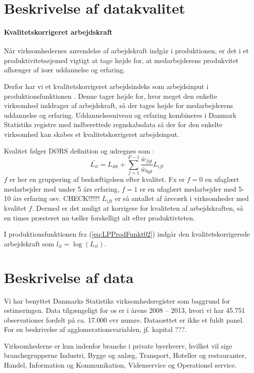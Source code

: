 \section{Beskrivelse af datakvalitet}
\paragraph{Kvalitetskorrigeret arbejdskraft}
Når virksomhedernes anvendelse af arbejdskraft indgår i produktionen, er det i et produktivitetsøjemed vigtigt at tage højde for, at medarbejderens produkvitet afhænger af især uddannelse og erfaring.

Derfor har vi et kvalitetskorrigeret arbejdsindeks som arbejdsinput i produktionsfunktionen \cite[s. 5]{dors2010baggrund}. Denne tager højde for, hvor meget den enkelte virksomhed inddrager af arbejdskraft, så der tages højde for medarbejderens uddannelse og erfaring. Uddannelsesniveau og erfaring kombineres i Danmark Statistiks registre med indberettede regnskabsdata så der for den enkelte virksomhed kan skabes et kvalitetskorrigeret arbejdsinput.

Kvalitet følger DØRS definition og udregnes som \cite[s. 5]{dors2010baggrund}:
\begin{equation}
	\bar{L_{it}} = 
	L_{i0t} + \sum_{f=1}^{F-1} \frac{\bar{w}_{fgt}}{\bar{w}_{0gt}} 
	L_{ift}
\end{equation}
$f$ er her en gruppering af beskæftigelsen efter kvalitet. Fx er $f=0$ en ufaglært medarbejder med under 5 års erfaring, $f=1$ er en ufaglært medarbejder med 5-10 års erfaring osv. CHECK!!!!!!
$L_{ift}$ er så antallet af årsværk i virksomheder med kvalitet $f$. Dermed er det muligt at korrigere for kvaliteten af arbejdskraften, så en times præsteret nu tæller forskelligt alt efter produktivteten.

I produktionsfunktionen fra (\ref{eq:LPProdFunkt02}) indgår den kvalitetskorrigerede arbejdskraft som $l_{it} = \log(L_{it})$.  

\section{Beskrivelse af data}
Vi har benyttet Danmarks Statistiks virksomhedsregister som baggrund for estimeringen. Data tilgængeligt for os er i årene 2008 -- 2013, hvori vi har 45.751 observationer fordelt på ca. 17.000 cvr numre. Datasættet er ikke et fuldt panel. For en beskrivelse af agglomerationsvariablen, jf. kapital ???.

Virksomhederne er kun indenfor branche i private byerhverv, hvilket vil sige branchegrupperne Industri, Bygge og anlæg, Transport, Hoteller og restauranter, Handel, Information og Kommunikation, Videnservice og Operationel service.


